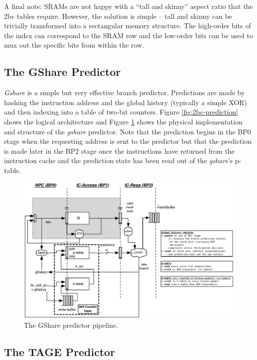 A final note: SRAMs are not happy with a ``tall and skinny'' aspect ratio that the 2bc tables require. However, the solution is simple -- tall and skinny can be trivially transformed into a rectangular memory structure.  The high-order bits of the index can correspond to the SRAM row and the low-order bits can be used to mux out the specific bits from within the row. 

\subsection{The GShare Predictor}

{\em Gshare} is a simple but very effective branch predictor. Predictions are made by hashing the instruction address and the global history (typically a simple XOR) and then indexing into a table of two-bit counters.  Figure \ref{fig:2bc-prediction} shows the logical architecture and Figure \ref{fig:gshare} shows the physical implementation and structure of the {\em gshare} predictor. Note that the prediction begins in the BP0 stage when the requesting address is sent to the predictor but that the prediction is made later in the BP2 stage once the instructions have returned from the instruction cache and the prediction state has been read out of the {\em gshare}'s p-table.


\begin{figure}[ht]
	\centering
	\centerline{\includegraphics[scale =0.95] {figures/gshare}}
	\caption{ \small The GShare predictor pipeline.}
	\label{fig:gshare}
\end{figure}

\subsection{The TAGE Predictor}\label{sec:tage}

